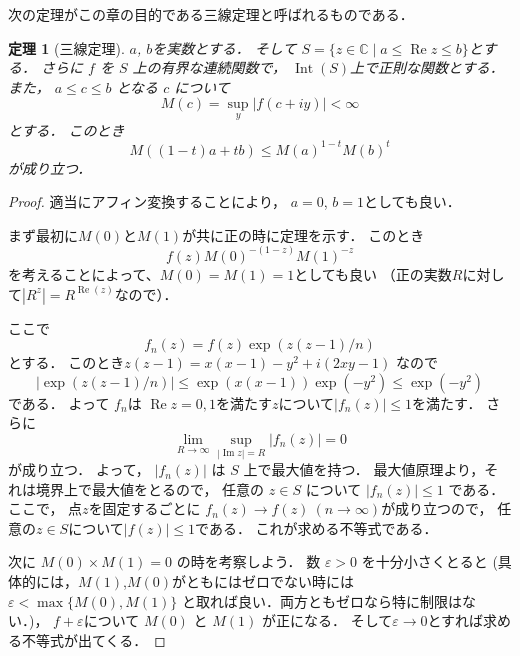 \documentclass[leqno]{jsarticle}
\newtheorem{thm}{定理}
\newcommand{\cc}{\mathbb{C}}
\newcommand{\ep}{\varepsilon}
\DeclareMathOperator{\nai}{Int}
\DeclareMathOperator{\re}{Re}
\DeclareMathOperator{\im}{Im}
\begin{document}
次の定理がこの章の目的である三線定理と呼ばれるものである．
\begin{thm}[三線定理]
$a$, 
$b$を実数とする．
そして
$S=\{z\in \cc\mid a\le \re z\le b \}$とする．
さらに
$f$
を
$S$
上の有界な連続関数で，
$\nai (S)$上で正則な関数とする．
また，
$a\le c\le b$
となる
$c$
について
\[
M(c)=\sup_y|f(c+iy)|<\infty
\]
とする．
このとき
\[
M((1-t)a+tb)\le M(a)^{1-t}M(b)^{t}
\]
が成り立つ．
\end{thm}
\begin{proof}
適当にアフィン変換することにより，
$a=0$, $b=1$としても良い．

まず最初に$M(0)$と$M(1)$が共に正の時に定理を示す．
このとき
\[
f(z)M(0)^{-(1-z)}M(1)^{-z}
\]
を考えることによって、$M(0)=M(1)=1$としても良い
（正の実数$R$に対して$|R^z|=R^{\re(z)}$なので）．

ここで
\[
f_n(z)=f(z)\exp(z(z-1)/n)
\]
とする．
このとき$z(z-1)=x(x-1)-y^2+i(2xy-1)$
なので
\[
|\exp(z(z-1)/n)|\le \exp(x(x-1))\exp(-y^2)\le \exp(-y^2)
\]
である．
よって
$f_n$は $\re z=0,1$を満たす$z$について$|f_n(z)|\le 1$を満たす．
さらに
\[
\lim_{R\to \infty}\sup_{|\im z|=R}|f_n(z)|=0
\]
が成り立つ．
よって，
$|f_n(z)|$
は
$S$
上で最大値を持つ．
最大値原理より，それは境界上で最大値をとるので，
任意の
$z\in S$
について
$|f_n(z)|\le 1$
である．
ここで，
点$z$を固定するごとに
$f_n(z)\to f(z)\ (n\to \infty)$が成り立つので，
任意の$z\in S$について$|f(z)|\le 1$である．
これが求める不等式である．

次に
$M(0)\times M(1)=0$
の時を考察しよう．
数
$\ep>0$
を十分小さくとると
(具体的には，$M(1)$,$M(0)$がともにはゼロでない時には$\ep<\max\{M(0),M(1)\}$
と取れば良い．両方ともゼロなら特に制限はない．)，
$f+\ep$について
$M(0)$
と
$M(1)$
が正になる．
そして$\ep\to 0$とすれば求める不等式が出てくる．
\end{proof}
\end{document}
